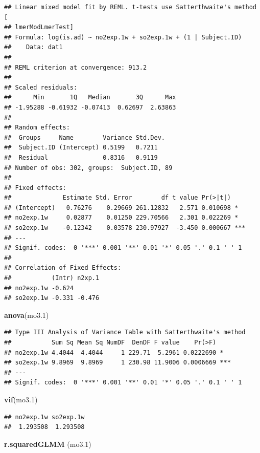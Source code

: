 \documentclass[12pt,]{article}
\newenvironment{Shaded}{\begin{snugshade}}{\end{snugshade}}
\newcommand{\FloatTok}[1]{\textcolor[rgb]{0.00,0.00,0.81}{#1}}
\newcommand{\KeywordTok}[1]{\textcolor[rgb]{0.13,0.29,0.53}{\textbf{#1}}}
\newcommand{\NormalTok}[1]{#1}
\begin{document}
\begin{verbatim}
## Linear mixed model fit by REML. t-tests use Satterthwaite's method [
## lmerModLmerTest]
## Formula: log(is.ad) ~ no2exp.1w + so2exp.1w + (1 | Subject.ID)
##    Data: dat1
## 
## REML criterion at convergence: 913.2
## 
## Scaled residuals: 
##      Min       1Q   Median       3Q      Max 
## -1.95288 -0.61932 -0.07413  0.62697  2.63863 
## 
## Random effects:
##  Groups     Name        Variance Std.Dev.
##  Subject.ID (Intercept) 0.5199   0.7211  
##  Residual               0.8316   0.9119  
## Number of obs: 302, groups:  Subject.ID, 89
## 
## Fixed effects:
##              Estimate Std. Error        df t value Pr(>|t|)    
## (Intercept)   0.76276    0.29669 261.12832   2.571 0.010698 *  
## no2exp.1w     0.02877    0.01250 229.70566   2.301 0.022269 *  
## so2exp.1w    -0.12342    0.03578 230.97927  -3.450 0.000667 ***
## ---
## Signif. codes:  0 '***' 0.001 '**' 0.01 '*' 0.05 '.' 0.1 ' ' 1
## 
## Correlation of Fixed Effects:
##           (Intr) n2xp.1
## no2exp.1w -0.624       
## so2exp.1w -0.331 -0.476
\end{verbatim}

\begin{Shaded}
\begin{Highlighting}[]
\KeywordTok{anova}\NormalTok{(mo3}\FloatTok{.1}\NormalTok{)}
\end{Highlighting}
\end{Shaded}

\begin{verbatim}
## Type III Analysis of Variance Table with Satterthwaite's method
##           Sum Sq Mean Sq NumDF  DenDF F value    Pr(>F)    
## no2exp.1w 4.4044  4.4044     1 229.71  5.2961 0.0222690 *  
## so2exp.1w 9.8969  9.8969     1 230.98 11.9006 0.0006669 ***
## ---
## Signif. codes:  0 '***' 0.001 '**' 0.01 '*' 0.05 '.' 0.1 ' ' 1
\end{verbatim}

\begin{Shaded}
\begin{Highlighting}[]
\KeywordTok{vif}\NormalTok{(mo3}\FloatTok{.1}\NormalTok{)}
\end{Highlighting}
\end{Shaded}

\begin{verbatim}
## no2exp.1w so2exp.1w 
##  1.293508  1.293508
\end{verbatim}

\begin{Shaded}
\begin{Highlighting}[]
\KeywordTok{r.squaredGLMM}\NormalTok{ (mo3}\FloatTok{.1}\NormalTok{)}
\end{Highlighting}
\end{Shaded}
\end{document}
